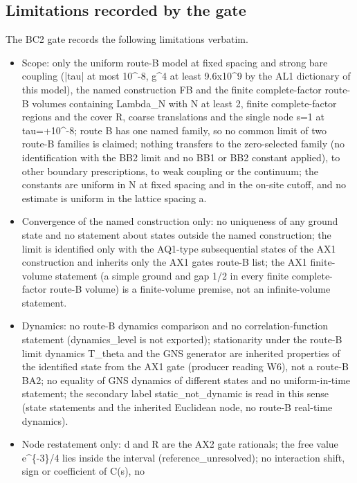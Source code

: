 \subsection{Limitations recorded by the gate}
\label{sec:bc2-limits}
The BC2 gate records the following limitations verbatim.
\begin{gatequote}
\begin{itemize}
\item Scope: only the uniform route-B model at fixed spacing and strong bare
coupling (|tau| at most 10\textasciicircum{}-8, g\textasciicircum{}4 at least
9.6x10\textasciicircum{}9 by the AL1 dictionary of this model), the named
construction FB and the finite complete-factor route-B volumes containing
Lambda\_N with N at least 2, finite complete-factor regions and the cover R,
coarse translations and the single node s=1 at tau=+10\textasciicircum{}-8;
route B has one named family, so no common limit of two route-B families is
claimed; nothing transfers to the zero-selected family (no identification with
the BB2 limit and no BB1 or BB2 constant applied), to other boundary
prescriptions, to weak coupling or the continuum; the constants are uniform in
N at fixed spacing and in the on-site cutoff, and no estimate is uniform in
the lattice spacing a.
\item Convergence of the named construction only: no uniqueness of any ground
state and no statement about states outside the named construction; the limit
is identified only with the AQ1-type subsequential states of the AX1
construction and inherits only the AX1 gate\textquotesingle{}s route-B list;
the AX1 finite-volume statement (a simple ground and gap 1/2 in every finite
complete-factor route-B volume) is a finite-volume premise, not an
infinite-volume statement.
\item Dynamics: no route-B dynamics comparison and no correlation-function
statement (dynamics\_level is not exported); stationarity under the route-B
limit dynamics T\_theta and the GNS generator are inherited properties of the
identified state from the AX1 gate (producer reading W6), not a route-B BA2;
no equality of GNS dynamics of different states and no uniform-in-time
statement; the secondary label static\_not\_dynamic is read in this sense
(state statements and the inherited Euclidean node, no route-B real-time
dynamics).
\item Node restatement only: d and R\textquotesingle{} are the AX2 gate
rationals; the free value e\textasciicircum{}\{-3\}/4 lies inside the interval
(reference\_unresolved); no interaction shift, sign or coefficient of C(s), no

\end{itemize}
\end{gatequote}
